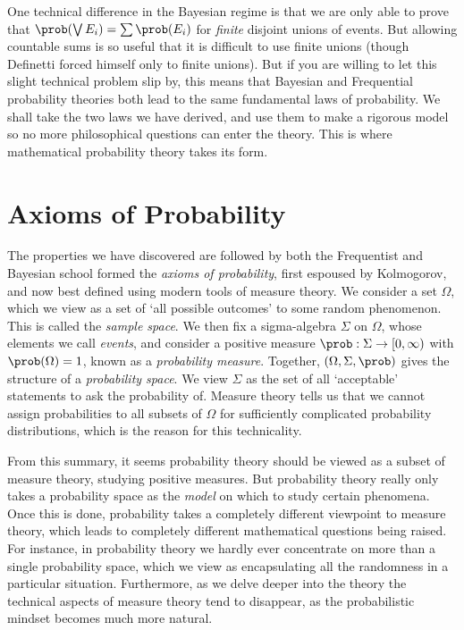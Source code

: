%
One technical difference in the Bayesian regime is that we are only able to prove that $\prob(\bigvee E_i) = \sum \prob(E_i)$ for {\it finite} disjoint unions of events. But allowing countable sums is so useful that it is difficult to use finite unions (though Definetti forced himself only to finite unions). But if you are willing to let this slight technical problem slip by, this means that Bayesian and Frequential probability theories both lead to the same fundamental laws of probability. We shall take the two laws we have derived, and use them to make a rigorous model so no more philosophical questions can enter the theory. This is where mathematical probability theory takes its form.

\section{Axioms of Probability}

The properties we have discovered are followed by both the Frequentist and Bayesian school formed the \emph{axioms of probability}, first espoused by Kolmogorov, and now best defined using modern tools of measure theory. We consider a set $\Omega$, which we view as a set of `all possible outcomes' to some random phenomenon. This is called the \emph{sample space}. We then fix a sigma-algebra $\Sigma$ on $\Omega$, whose elements we call \emph{events}, and consider a positive measure $\prob: \Sigma \to [0,\infty)$ with $\prob(\Omega) = 1$, known as a \emph{probability measure}. Together, $(\Omega, \Sigma, \prob)$ gives the structure of a \emph{probability space}. We view $\Sigma$ as the set of all `acceptable' statements to ask the probability of. Measure theory tells us that we cannot assign probabilities to all subsets of $\Omega$ for sufficiently complicated probability distributions, which is the reason for this technicality.

From this summary, it seems probability theory should be viewed as a subset of measure theory, studying positive measures. But probability theory really only takes a probability space as the \emph{model} on which to study certain phenomena. Once this is done, probability takes a completely different viewpoint to measure theory, which leads to completely different mathematical questions being raised. For instance, in probability theory we hardly ever concentrate on more than a single probability space, which we view as encapsulating all the randomness in a particular situation. Furthermore, as we delve deeper into the theory the technical aspects of measure theory tend to disappear, as the probabilistic mindset becomes much more natural.

